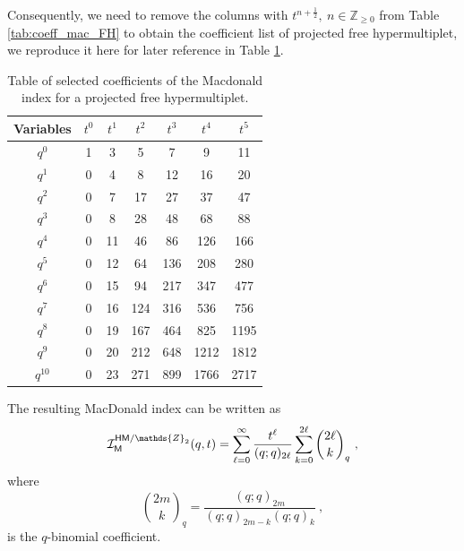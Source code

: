 \documentclass[a4paper,10pt]{article}
\newcommand{\Z}{\mathds{Z}}
\newcommand{\mr}[1]{\mathsf{#1}}
\def\CI {{\cal I}}
\def\CI {{{\cal I}}}
\begin{document}
Consequently, we need to remove the columns with $t^{n+\frac{1}{2}},~n\in\Z_{\geq 0}$ from Table \ref{tab:coeff_mac_FH} to obtain the coefficient list of projected free hypermultiplet, we reproduce it here for later reference in Table \ref{tab:coeff_mac_proj_FH}.
\begin{table}[h]
    \centering
    \begin{tabular}{|c|cccccc|}
    \hline
   Variables & $t^0$ & $t^{1}$ & $t^{2}$ & $t^{3}$ & $t^{4}$ & $t^{5}$ \\
    \hline
    $q^{0}$  & 1 & 3 & 5 & 7 & 9 & 11 \\
    $q^{1}$  & 0 & 4 & 8 & 12 & 16 & 20 \\
    $q^{2}$  & 0 & 7 & 17 & 27 & 37 & 47 \\
    $q^{3}$  & 0 & 8 & 28 & 48 & 68 & 88 \\
    $q^{4}$  & 0 & 11 & 46 & 86 & 126 & 166 \\
    $q^{5}$  & 0 & 12 & 64 & 136 & 208 & 280 \\
    $q^{6}$  & 0 & 15 & 94 & 217 & 347 & 477 \\
    $q^{7}$  & 0 & 16 & 124 & 316 & 536 & 756 \\
    $q^{8}$  & 0 & 19 & 167 & 464 & 825 & 1195 \\
    $q^{9}$  & 0 & 20 & 212 & 648 & 1212 & 1812 \\
    $q^{10}$ & 0 & 23 & 271 & 899 & 1766 & 2717 \\
    \hline
    \end{tabular}
    \caption{Table of selected coefficients of the Macdonald index for a projected free hypermultiplet.}
    \label{tab:coeff_mac_proj_FH}
\end{table}

The resulting MacDonald index can be written as
\begin{equation}
    \CI_{\mr{M}}^{\mr{HM}/\mathds{Z}_2}(q,t)=\sum_{\ell=0}^{\infty}\frac{t^\ell}{(q;q)_{2\ell}}\sum_{k=0}^{2\ell}{2\ell\choose k}_q~,
\end{equation}
where 
\begin{equation}
\binom{2m}{k}_q=\frac{(q;q)_{2m}}{(q;q)_{2m-k}(q;q)_k}~,    
\end{equation}
is the $q$-binomial coefficient.
\end{document}
